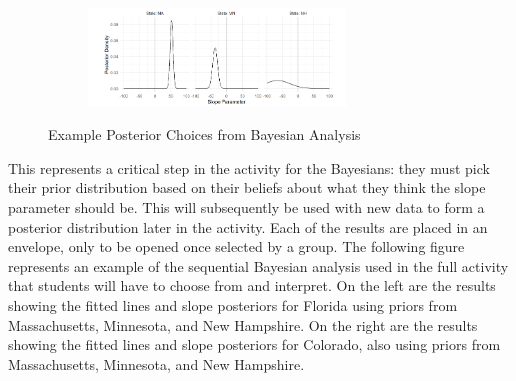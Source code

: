 \documentclass[
  12pt,
  letterpaper,
  DIV=11,
  numbers=noendperiod]{scrartcl}
\begin{document}
\begin{figure}

{\centering 

\begin{figure}[H]

{\centering \includegraphics[width=0.75\textwidth,height=\textheight]{01-mpsa-bayesSlope-ex1.png}

}

\end{figure}

}

\caption{\label{fig-slopes2}Example Posterior Choices from Bayesian
Analysis}

\end{figure}

This represents a critical step in the activity for the Bayesians: they
must pick their prior distribution based on their beliefs about what
they think the slope parameter should be. This will subsequently be used
with new data to form a posterior distribution later in the activity.
Each of the results are placed in an envelope, only to be opened once
selected by a group. The following figure represents an example of the
sequential Bayesian analysis used in the full activity that students
will have to choose from and interpret. On the left are the results
showing the fitted lines and slope posteriors for Florida using priors
from Massachusetts, Minnesota, and New Hampshire. On the right are the
results showing the fitted lines and slope posteriors for Colorado, also
using priors from Massachusetts, Minnesota, and New Hampshire.
\end{document}
